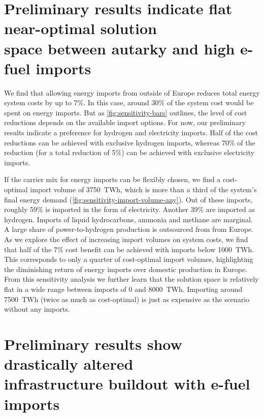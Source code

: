 \documentclass[10pt,5p,reversenotenum,lefttitle]{elsarticle}
\begin{document}
\section*{Preliminary results indicate flat near-optimal solution\\space between autarky and high e-fuel imports}

We find that allowing energy imports from outside of Europe reduces total energy
system costs by up to 7\%. In this case, around 30\% of the system cost would be
spent on energy imports. But as \cref{fig:sensitivity-bars} outlines, the level
of cost reductions depends on the available import options. For now, our
preliminary results indicate a preference for hydrogen and electricity imports.
Half of the cost reductions can be achieved with exclusive hydrogen imports,
whereas 70\% of the reduction (for a total reduction of 5\%) can be achieved
with exclusive electricity imports.

If the carrier mix for energy imports can be flexibly chosen, we find a
cost-optimal import volume of 3750~TWh, which is more than a third of the
system's final energy demand (\cref{fig:sensitivity-import-volume-any}). Out of
these imports, roughly 59\% is imported in the form of electricity. Another 39\%
are imported as hydrogen. Imports of liquid hydrocarbons, ammonia and methane
are marginal. A large share of power-to-hydrogen production is outsourced from
from Europe. As we explore the effect of increasing import volumes on system
costs, we find that half of the 7\% cost benefit can be achieved with imports
below 1000~TWh. This corresponds to only a quarter of cost-optimal import
volumes, highlighting the diminishing return of energy imports over domestic
production in Europe. From this sensitivity analysis we further learn that the
solution space is relatively flat in a wide range between imports of 0 and
8000~TWh. Importing around 7500~TWh (twice as much as cost-optimal) is just as
expensive as the scenario without any imports.

\section*{Preliminary results show drastically altered\\infrastructure buildout with e-fuel imports}
\end{document}
